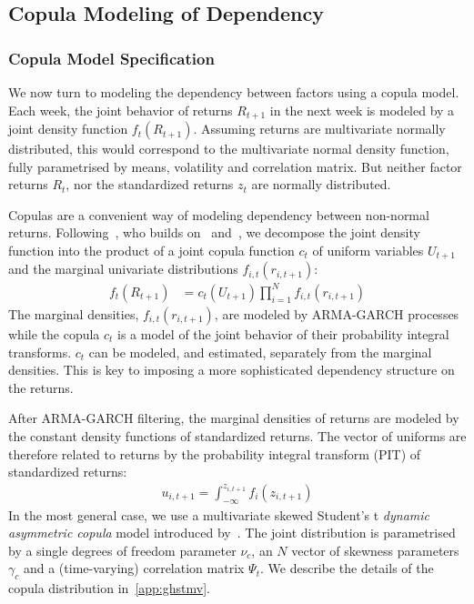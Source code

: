 
\subsection{Copula Modeling of Dependency} %
\label{sub:05_04_copula}

\subsubsection{Copula Model Specification}

We now turn to modeling the dependency between factors using a copula model. 
Each week, the joint behavior of returns $R_{t+1}$ in the next week is modeled by a joint density function $f_t(R_{t+1})$. Assuming returns are multivariate normally distributed, this would correspond to the multivariate normal density function, fully parametrised by means, volatility and correlation matrix. But neither factor returns $R_t$, nor the standardized returns $z_t$ are normally distributed.

Copulas are a convenient way of modeling dependency between non-normal returns. Following~\textcite{ChristoffersenErrunzaJacobLanglois2012}, who builds on~\textcite{Patton2006} and~\textcite{Sklar1959}, we decompose the joint density function into the product of a joint copula function $c_t$ of uniform variables $U_{t+1}$ and the marginal univariate distributions $f_{i,t}(r_{i, t+1})$:
\begin{align}
  f_t(R_{t+1}) &=
    c_t(U_{t+1}) \prod^N_{i = 1} f_{i,t}(r_{i, t + 1})
\end{align}
The marginal densities, $f_{i,t}(r_{i, t + 1})$, are modeled by ARMA-GARCH processes while the copula $c_t$ is a model of the joint behavior of their probability integral transforms. $c_t$ can be modeled, and estimated, separately from the marginal densities. This is key to imposing a more sophisticated dependency structure on the returns.

After ARMA-GARCH filtering, the marginal densities of returns are modeled by the constant density functions of standardized returns. The vector of uniforms are therefore related to returns by the probability integral transform (PIT) of standardized returns:
\begin{align}
  u_{i, t+1} = \int_{-\infty}^{z_{i,t+1}} f_{i}(z_{i,t+1})
\end{align}
In the most general case, we use a multivariate skewed Student's t \emph{dynamic asymmetric copula} model introduced by~\textcite{ChristoffersenErrunzaJacobLanglois2012}. The joint distribution is parametrised by a single degrees of freedom parameter $\nu_c$, an $N$ vector of skewness parameters $\gamma_{c}$ and a (time-varying) correlation matrix $\Psi_{t}$. We describe the details of the copula distribution in~\autoref{app:ghstmv}.

